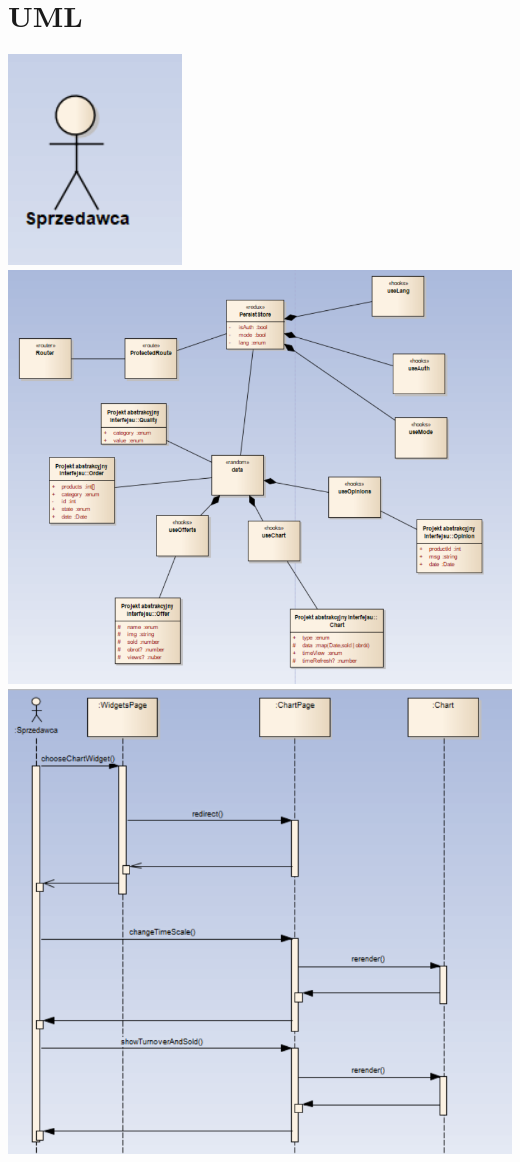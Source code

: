 \documentclass[a4paper,11pt]{article}
\begin{document}
\section{UML}
\includegraphics[scale=0.5]{src2/src2/c9.png}\\
\includegraphics[scale=0.5]{src2/src2/c10.png}\\
\includegraphics[scale=0.5]{src2/src2/c8.png}\\
\end{document}
